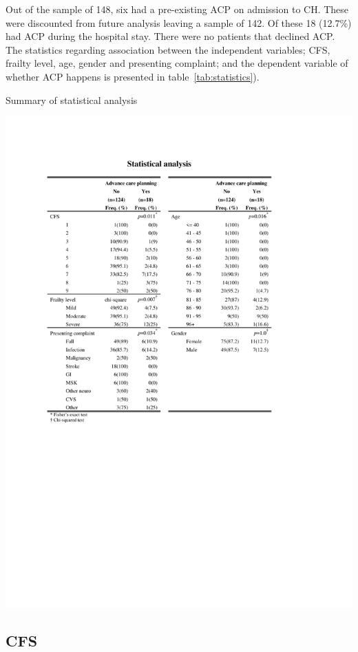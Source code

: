 \documentclass
[
	12pt,
	a4paper,
	oneside,
]{report}
\begin{document}
Out of the sample of 148, six had a pre-existing ACP on admission to CH. These 
were discounted from future analysis leaving a sample of 142. Of these 18 
(12.7\%) had ACP during the hospital stay. There were no patients that 
declined ACP. The statistics regarding association between the independent 
variables; CFS, frailty level, age, gender and presenting complaint; and the 
dependent variable of whether ACP happens is presented in 
table~\ref{tab:statistics}).

\begin{table}[ht]
\caption{Summary of statistical analysis}
\label{tab:statistics}
\includegraphics[width=\textwidth,
	trim={2.5cm 10cm 2.5cm 2.5cm},
	clip]{media/statistical-analysis}
\end{table}

\subsection{CFS}
\end{document}
